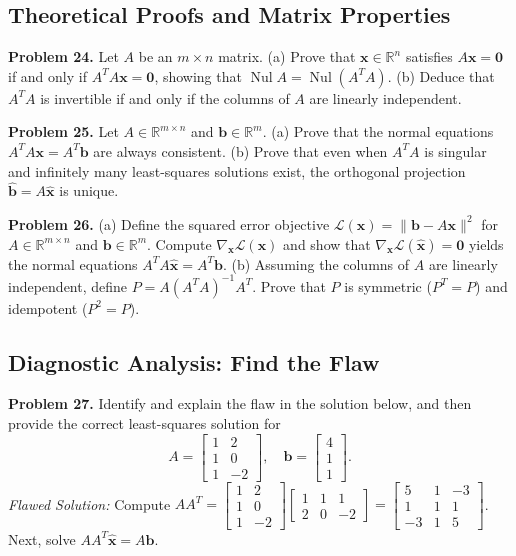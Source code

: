 \documentclass[11pt, letterpaper]{article}
\theoremstyle{definition}
\theoremstyle{remark}
\begin{document}
\subsection{Theoretical Proofs and Matrix Properties}

\textbf{Problem 24.} Let $A$ be an $m \times n$ matrix. (a) Prove that $\mathbf{x} \in \mathbb{R}^n$ satisfies $A\mathbf{x} = \mathbf{0}$ if and only if $A^T A \mathbf{x} = \mathbf{0}$, showing that $\operatorname{Nul} A = \operatorname{Nul}(A^T A)$. (b) Deduce that $A^T A$ is invertible if and only if the columns of $A$ are linearly independent.

\textbf{Problem 25.} Let $A \in \mathbb{R}^{m \times n}$ and $\mathbf{b} \in \mathbb{R}^m$. (a) Prove that the normal equations $A^T A \mathbf{x} = A^T \mathbf{b}$ are always consistent. (b) Prove that even when $A^T A$ is singular and infinitely many least-squares solutions exist, the orthogonal projection $\hat{\mathbf{b}} = A\hat{\mathbf{x}}$ is unique.

\textbf{Problem 26.} (a) Define the squared error objective $\mathcal{L}(\mathbf{x}) = \|\mathbf{b} - A\mathbf{x}\|^2$ for $A \in \mathbb{R}^{m \times n}$ and $\mathbf{b} \in \mathbb{R}^m$. Compute $\nabla_{\mathbf{x}}\mathcal{L}(\mathbf{x})$ and show that $\nabla_{\mathbf{x}}\mathcal{L}(\hat{\mathbf{x}}) = \mathbf{0}$ yields the normal equations $A^T A \hat{\mathbf{x}} = A^T \mathbf{b}$. (b) Assuming the columns of $A$ are linearly independent, define $P = A(A^T A)^{-1} A^T$. Prove that $P$ is symmetric ($P^T = P$) and idempotent ($P^2 = P$).

\subsection{Diagnostic Analysis: Find the Flaw}

\textbf{Problem 27.} Identify and explain the flaw in the solution below, and then provide the correct least-squares solution for
\[
A = \begin{bmatrix} 1 & 2 \\ 1 & 0 \\ 1 & -2 \end{bmatrix}, \quad \mathbf{b} = \begin{bmatrix} 4 \\ 1 \\ 1 \end{bmatrix}.
\]
\textit{Flawed Solution:} Compute $AA^T = \begin{bmatrix} 1 & 2 \\ 1 & 0 \\ 1 & -2 \end{bmatrix} \begin{bmatrix} 1 & 1 & 1 \\ 2 & 0 & -2 \end{bmatrix} = \begin{bmatrix} 5 & 1 & -3 \\ 1 & 1 & 1 \\ -3 & 1 & 5 \end{bmatrix}$. Next, solve $AA^T \hat{\mathbf{x}} = A\mathbf{b}$.
\end{document}

